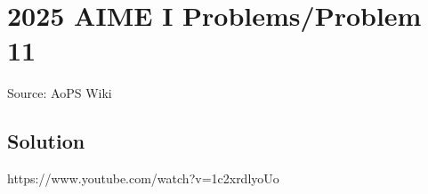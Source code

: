 \documentclass[12pt]{article}
\begin{document}
\section*{{2025 AIME I Problems/Problem 11}}
Source: AoPS Wiki

\subsection*{Solution}
https://www.youtube.com/watch?v=1c2xrdlyoUo
\end{document}
